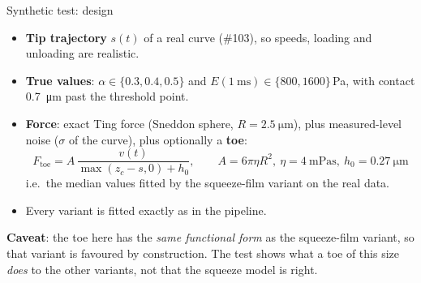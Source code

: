 \documentclass[aspectratio=169,9pt]{beamer}
\begin{document}
\begin{frame}{Synthetic test: design}
\small
\begin{itemize}
\item \textbf{Tip trajectory} $s(t)$ of a real curve (\#103), so speeds, loading and unloading are realistic.
\item \textbf{True values}: $\alpha\in\{0.3,0.4,0.5\}$ and $E(\SI{1}{\milli\second})\in\{800,1600\}$\,Pa, with contact \SI{0.7}{\micro\metre} past the threshold point.
\item \textbf{Force}: exact Ting force (Sneddon sphere, $R=\SI{2.5}{\micro\metre}$), plus measured-level noise ($\sigma$ of the curve), plus optionally a \textbf{toe}:
\[F_\text{toe}=A\,\frac{v(t)}{\max(z_c-s,0)+h_0},\qquad A=6\pi\eta R^2,\ \eta=\SI{4}{\milli\pascal\second},\ h_0=\SI{0.27}{\micro\metre}\]
 i.e.\ the median values fitted by the squeeze-film variant on the real data.
\item Every variant is fitted exactly as in the pipeline.
\end{itemize}
\vspace{4pt}
\textbf{Caveat}: the toe here has the \emph{same functional form} as the squeeze-film variant, so that variant is favoured by construction. The test shows what a toe of this size \emph{does} to the other variants, not that the squeeze model is right.
\end{frame}
\end{document}
